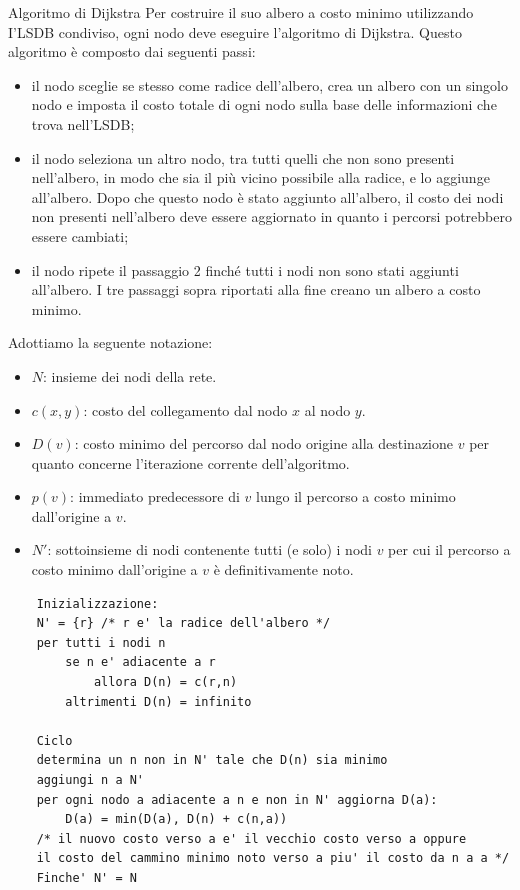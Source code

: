 \begin{Algoritmo}{Algoritmo di Dijkstra}{}
    Per costruire il suo albero a costo minimo utilizzando I'LSDB condiviso, ogni nodo deve eseguire l'algoritmo di Dijkstra. Questo algoritmo è composto dai seguenti passi:
    \begin{itemize}
        \item il nodo sceglie se stesso come radice dell'albero, crea un albero con un singolo nodo e imposta il costo totale di ogni nodo sulla base delle informazioni che trova nell'LSDB;
        \item il nodo seleziona un altro nodo, tra tutti quelli che non sono presenti nell'albero, in modo che sia il più vicino possibile alla radice, e lo aggiunge all'albero. Dopo che questo nodo è stato aggiunto all'albero, il costo dei nodi non presenti nell'albero deve essere aggiornato in quanto i percorsi potrebbero essere cambiati;
        \item il nodo ripete il passaggio 2 finché tutti i nodi non sono stati aggiunti all'albero. I tre passaggi sopra riportati alla fine creano un albero a costo minimo.
    \end{itemize}
    
    Adottiamo la seguente notazione:
    \begin{itemize}
        \item $N$: insieme dei nodi della rete.
        \item $c(x,y)$: costo del collegamento dal nodo $x$ al nodo $y$.
        \item $D(v)$: costo minimo del percorso dal nodo origine alla destinazione $v$ per quanto concerne l'iterazione corrente dell'algoritmo.
        \item $p(v)$: immediato predecessore di $v$ lungo il percorso a costo minimo dall'origine a $v$.
        \item $N'$: sottoinsieme di nodi contenente tutti (e solo) i nodi $v$ per cui il percorso a costo minimo dall'origine a $v$ è definitivamente noto.
    \end{itemize}

    \begin{lstlisting}
    Inizializzazione:
    N' = {r} /* r e' la radice dell'albero */
    per tutti i nodi n
        se n e' adiacente a r
            allora D(n) = c(r,n)
        altrimenti D(n) = infinito

    Ciclo
    determina un n non in N' tale che D(n) sia minimo
    aggiungi n a N'
    per ogni nodo a adiacente a n e non in N' aggiorna D(a):
        D(a) = min(D(a), D(n) + c(n,a))
    /* il nuovo costo verso a e' il vecchio costo verso a oppure
    il costo del cammino minimo noto verso a piu' il costo da n a a */
    Finche' N' = N
    \end{lstlisting}
\end{Algoritmo}

